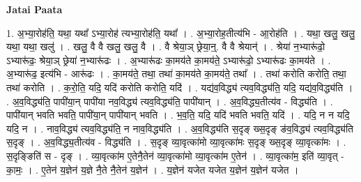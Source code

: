 \documentclass[17pt]{extarticle}
\begin{document}
\textbf{Jatai Paata} \newline

1. अ॒भ्या॒रोह॑ति॒ यथा॒ यथा᳚ ऽभ्या॒रोह॑ त्यभ्या॒रोह॑ति॒ यथा᳚ । . अ॒भ्या॒रोह॒तीत्य॑भि - आ॒रोह॑ति । . यथा॒ खलु॒ खलु॒ यथा॒ यथा॒ खलु॑ । . खलु॒ वै वै खलु॒ खलु॒ वै । . वै श्रेया॒ञ् छ्रेया॒न्॒. वै वै श्रेयान्॑ । . श्रेया॑ न॒भ्यारू॑ढो॒ ऽभ्यारू॑ढः॒ श्रेया॒ञ् छ्रेया॑ न॒भ्यारू॑ढः । . अ॒भ्यारू॑ढः का॒मय॑ते का॒मय॑ते॒ ऽभ्यारू॑ढो॒ ऽभ्यारू॑ढः का॒मय॑ते । . अ॒भ्यारू॑ढ॒ इत्य॑भि - आरू॑ढः । . का॒मय॑ते॒ तथा॒ तथा॑ का॒मय॑ते का॒मय॑ते॒ तथा᳚ । . तथा॑ करोति करोति॒ तथा॒ तथा॑ करोति । . क॒रो॒ति॒ यदि॒ यदि॑ करोति करोति॒ यदि॑ । . यद्य॑व॒विद्ध्य॑ त्यव॒विद्ध्य॑ति॒ यदि॒ यद्य॑व॒विद्ध्य॑ति । . अ॒व॒विद्ध्य॑ति॒ पापी॑या॒न् पापी॑या नव॒विद्ध्य॑ त्यव॒विद्ध्य॑ति॒ पापी॑यान् । . अ॒व॒विद्ध्य॒तीत्य॑व - विद्ध्य॑ति । . पापी॑यान् भवति भवति॒ पापी॑या॒न् पापी॑यान् भवति । . भ॒व॒ति॒ यदि॒ यदि॑ भवति भवति॒ यदि॑ । . यदि॒ न न यदि॒ यदि॒ न । . नाव॒विद्ध्य॑ त्यव॒विद्ध्य॑ति॒ न नाव॒विद्ध्य॑ति । . अ॒व॒विद्ध्य॑ति स॒दृङ् ख्स॒दृङ् ङ॑व॒विद्ध्य॑ त्यव॒विद्ध्य॑ति स॒दृङ् । . अ॒व॒विद्ध्य॒तीत्य॑व - विद्ध्य॑ति । . स॒दृङ् व्या॒वृत्का॑मो व्या॒वृत्का॑मः स॒दृङ् ख्स॒दृङ् व्या॒वृत्का॑मः । . स॒दृङ्ङिति॑ स - दृङ् । . व्या॒वृत्का॑म ए॒तेनै॒तेन॑ व्या॒वृत्का॑मो व्या॒वृत्का॑म ए॒तेन॑ । . व्या॒वृत्का॑म॒ इति॑ व्या॒वृत् - का॒मः॒ । . ए॒तेन॑ य॒ज्ञेन॑ य॒ज्ञे नै॒ते नै॒तेन॑ य॒ज्ञेन॑ । . य॒ज्ञेन॑ यजेत यजेत य॒ज्ञेन॑ य॒ज्ञेन॑ यजेत । \newline
\end{document}
